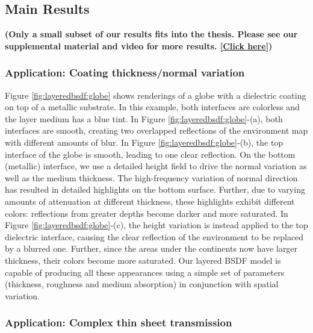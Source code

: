 


\subsection{Main Results}
\label{subsec:res_main}

\textbf{(Only a small subset of our results fits into the thesis. Please see our supplemental material and video for more results.
[\href{https://www.ics.uci.edu/~yug10/webpage/suppl/2018TOG/index.html}{Click here}])}


\subsubsection{Application: Coating thickness/normal variation}

Figure \ref{fig:layeredbsdf:globe} shows renderings of a globe with a dielectric coating on top of a metallic substrate.
In this example, both interfaces are colorless and the layer medium has a blue tint.
In Figure \ref{fig:layeredbsdf:globe}-(a), both interfaces are smooth, creating two overlapped reflections of the environment map with different amounts of blur.
In Figure \ref{fig:layeredbsdf:globe}-(b), the top interface of the globe is smooth, leading to one clear reflection.
On the bottom (metallic) interface, we use a detailed height field to drive the normal variation as well as the medium thickness.
The high-frequency variation of normal direction has resulted in detailed highlights on the bottom surface.
Further, due to varying amounts of attenuation at different thickness, these highlights exhibit different colors: reflections from greater depths become darker and more saturated. 
In Figure \ref{fig:layeredbsdf:globe}-(c), the height variation is instead applied to the top dielectric interface, causing the clear reflection of the environment to be replaced by a blurred one.
Further, since the areas under the continents now have larger thickness, their colors become more saturated.
Our layered BSDF model is capable of producing all these appearances using a simple set of parameters (thickness, roughness and medium absorption) in conjunction with spatial variation.

 

\subsubsection{Application: Complex thin sheet transmission}


